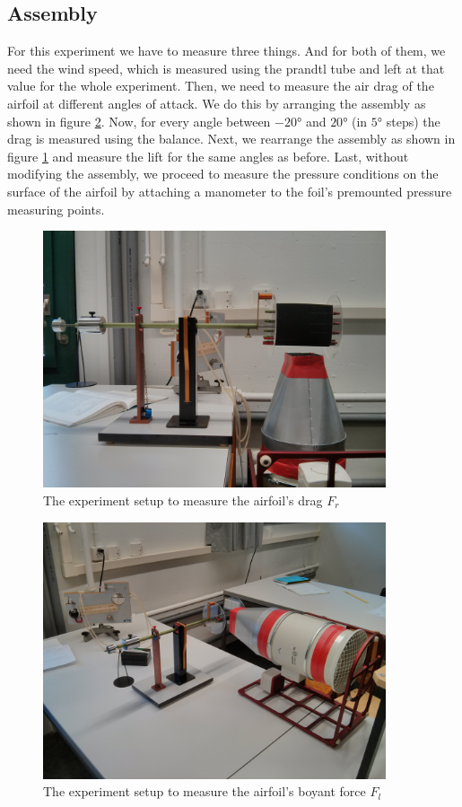 \documentclass{scrreprt}
\begin{document}
\subsection{Assembly}
For this experiment we have to measure three things. And for both of them, we need the wind speed, which is measured using the prandtl tube and left at that value for the whole experiment. Then, we need to measure the air drag of the airfoil at different angles of attack. We do this by arranging the assembly as shown in figure \ref{fig:assembly1}. Now, for every angle between $\ang{-20}$ and $\ang{+20}$ (in $\ang{5}$ steps) the drag is measured using the balance.
Next, we rearrange the assembly as shown in figure \ref{fig:assembly2} and measure the lift for the same angles as before. Last, without modifying the assembly, we proceed to measure the pressure conditions on the surface of the airfoil by attaching a manometer to the foil's premounted pressure measuring points.

\begin{figure}[H]
	\centering
  \includegraphics[width=0.9\textwidth]{img/assembly2.jpg}
	\caption{The experiment setup to measure the airfoil's drag $F_r$}
	\label{fig:assembly2}
\end{figure}

\begin{figure}[H]
	\centering
  \includegraphics[width=0.9\textwidth]{img/assembly1.jpg}
	\caption{The experiment setup to measure the airfoil's boyant force $F_l$}
	\label{fig:assembly1}
\end{figure}
\end{document}
